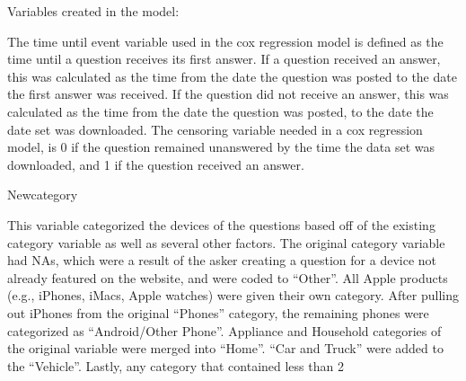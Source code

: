 \documentclass[12pt]{article}
\begin{document}
    Variables created in the model: 

The time until event variable used in the cox regression model is defined as the time until a question receives its first answer. If a question received an answer, this was calculated as the time from the date the question was posted to the date the first answer was received. If the question did not receive an answer, this was calculated as the time from the date the question was posted, to the date the date set was downloaded. The censoring variable needed in a cox regression model, is 0 if the question remained unanswered by the time the data set was downloaded, and 1 if the question received an answer. 

Newcategory 

This variable categorized the devices of the questions based off of the existing category variable as well as several other factors. The original category variable had NAs, which were a result of the asker creating a question for a device not already featured on the website, and were coded to “Other”. All Apple products (e.g., iPhones, iMacs, Apple watches) were given their own category. After pulling out iPhones from the original “Phones” category, the remaining phones were categorized as “Android/Other Phone”. Appliance and Household categories of the original variable were merged into “Home”. “Car and Truck” were added to the “Vehicle”. Lastly, any category that contained less than 2%
\end{document}
